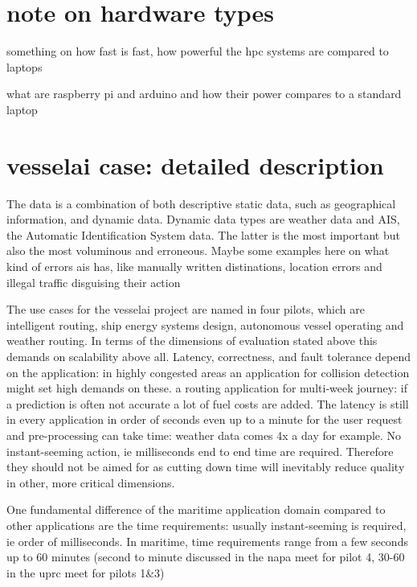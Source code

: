 \section{note on hardware types}

something on how fast is fast, how powerful the hpc systems are compared to laptops

what are raspberry pi and arduino and how their power compares to a standard laptop

\section{vesselai case: detailed description}

The data is a combination of both descriptive static data, such as geographical information, and dynamic data. Dynamic data types are weather data and AIS, the Automatic Identification System data. The latter is the most important but also the most voluminous and erroneous. Maybe some examples here on what kind of errors ais has, like manually written distinations, location errors and illegal traffic disguising their action


The use cases for the vesselai project are named in four pilots, which are intelligent routing, ship energy systems design, autonomous vessel operating and weather routing. In terms of the dimensions of evaluation stated above this demands on scalability above all. Latency, correctness, and fault tolerance depend on the application: in highly congested areas an application for collision detection might set high demands on these. a routing application for multi-week journey: if a prediction is often not accurate a lot of fuel costs are added. The latency is still in every application in order of seconds even up to a minute for the user request and pre-processing can take time: weather data comes 4x a day for example. No instant-seeming action, ie milliseconds end to end time are required. Therefore they should not be aimed for as cutting down time will inevitably reduce quality in other, more critical dimensions.

One fundamental difference of the maritime application domain compared to other applications are the time requirements: usually instant-seeming is required, ie order of milliseconds. In maritime, time requirements range from a few seconds up to 60 minutes (second to minute discussed in the napa meet for pilot 4, 30-60 in the uprc meet for pilots 1&3)

